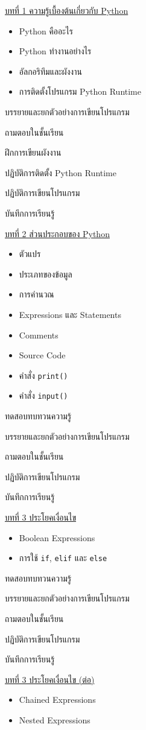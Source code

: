 {
\underline{บทที่ 1 ความรู้เบื้องต้นเกี่ยวกับ Python}
\begin{itemize}
\item Python คืออะไร
\item  Python ทำงานอย่างไร
\item  อัลกอริทึมและผังงาน
\item  การติดตั้งโปรแกรม Python Runtime
\end{itemize}
}
{
\item บรรยายและยกตัวอย่างการเขียนโปรแกรม
\item  ถามตอบในชั้นเรียน
\item  ฝึกการเขียนผังงาน
\item  ปฏิบัติการติดตั้ง Python Runtime
\item  ปฏิบัติการเขียนโปรแกรม
\item  บันทึกการเรียนรู้
}
{
\underline{บทที่ 2 ส่วนประกอบของ Python}
\begin{itemize}
\item ตัวแปร
\item ประเภทของข้อมูล
\item การคำนวณ
\item Expressions และ Statements
\item Comments
\item Source Code
\item คำสั่ง  \texttt{print()}
\item คำสั่ง  \texttt{input()}
\end{itemize}
}
{
\item ทดสอบทบทวนความรู้
\item  บรรยายและยกตัวอย่างการเขียนโปรแกรม
\item  ถามตอบในชั้นเรียน
\item  ปฏิบัติการเขียนโปรแกรม
\item  บันทึกการเรียนรู้
}
{
\underline{บทที่ 3 ประโยคเงื่อนไข}
\begin{itemize}
\item Boolean Expressions
	\item การใช้  \texttt{if},  \texttt{elif} และ  \texttt{else}
\end{itemize}
}
{
\item ทดสอบทบทวนความรู้
\item  บรรยายและยกตัวอย่างการเขียนโปรแกรม
\item  ถามตอบในชั้นเรียน
\item  ปฏิบัติการเขียนโปรแกรม
\item  บันทึกการเรียนรู้
}
{
\underline{บทที่ 3 ประโยคเงื่อนไข (ต่อ)}
\begin{itemize}
\item Chained Expressions
\item  Nested Expressions
\end{itemize}
}
